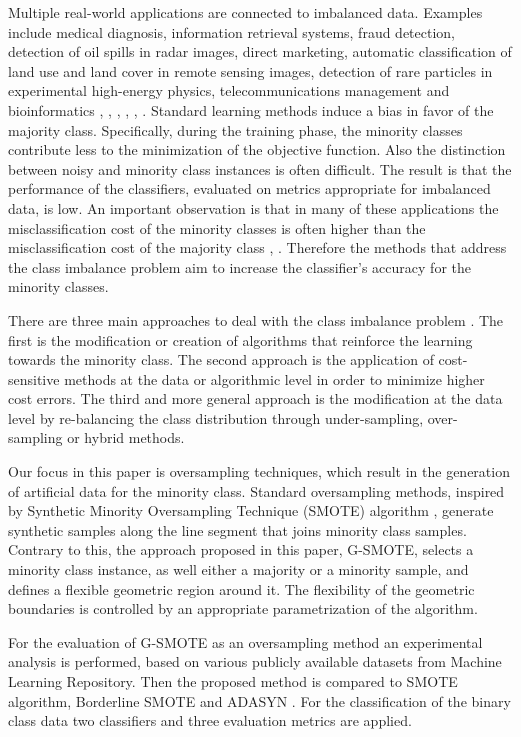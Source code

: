 \documentclass[parskip=full]{scrartcl}
\begin{document}
Multiple real-world applications are connected to imbalanced data. Examples include medical diagnosis, information retrieval systems, fraud detection, detection of oil spills in radar images, direct marketing, automatic classification of land use and land cover in remote sensing images, detection of rare particles in experimental high-energy physics, telecommunications management and bioinformatics \cite{Akbani2004}, \cite{He2009}, \cite{Clearwater1991}, \cite{Graves2016}, \cite{Verbeke2012}, \cite{Zhao2008}. Standard learning methods induce a bias in favor of the majority class. Specifically, during the training phase, the minority classes contribute less to the minimization of the objective function. Also the distinction between noisy and minority class instances is often difficult. The result is that the performance of the classifiers, evaluated on metrics appropriate for imbalanced data, is low. An important observation is that in many of these applications the misclassification cost of the minority classes is often higher than the misclassification cost of the majority class \cite{Domingos1999}, \cite{Ting2002}. Therefore the methods that address the class imbalance problem aim to increase the classifier's accuracy for the minority classes.

There are three main approaches to deal with the class imbalance problem \cite{Fernandez2013}. The first is the modification or creation of algorithms that reinforce the learning towards the minority class. The second approach is the application of cost-sensitive methods at the data or algorithmic level in order to minimize higher cost errors. The third and more general approach is the modification at the data level by re-balancing the class distribution through under-sampling, over-sampling or hybrid methods.

Our focus in this paper is oversampling techniques, which result in the generation of artificial data for the minority class. Standard oversampling methods, inspired by Synthetic Minority Oversampling Technique (SMOTE) algorithm \cite{Chawla2002}, generate synthetic samples along the line segment that joins minority class samples. Contrary to this, the approach proposed in this paper, G-SMOTE, selects a minority class instance, as well either a majority or a minority sample, and defines a flexible geometric region around it. The flexibility of the geometric boundaries is controlled by an appropriate parametrization of the algorithm.

For the evaluation of G-SMOTE as an oversampling method an experimental analysis is performed, based on various publicly available datasets from Machine Learning Repository. Then the proposed method is compared to SMOTE algorithm, Borderline SMOTE \cite{Han2005} and ADASYN \cite{He2008}. For the classification of the binary class data two classifiers and three evaluation metrics are applied.
\end{document}
